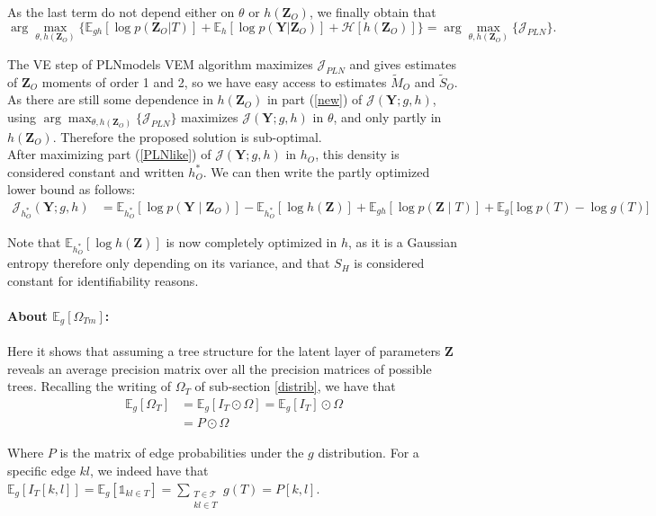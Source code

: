 \documentclass[11pt,a4paper]{article}
\newcommand{\argmax}{\arg\!\max}
\newcommand{\entr}{\mathcal{H}}
\newcommand{\Ybf}{\boldsymbol{Y}}
\newcommand{\Zbf}{\boldsymbol{Z}}
\newcommand{\Esp}{\mathds{E}}
\begin{document}
As the last term do not depend either on $\theta$ or $h(\Zbf_O)$, we finally obtain that
 $$ \argmax_{\theta, h(\Zbf_O)} \big\{\Esp_{gh}[\log p(\Zbf_O | T)] +\Esp_h[\log p(\Ybf|\Zbf_O)]+ \entr[h(\Zbf_O)]\big\} = \argmax_{\theta, h(\Zbf_O)} \big\{ \mathcal{J}_{PLN} \big\}.$$

The VE step of PLNmodels VEM algorithm maximizes $\mathcal{J}_{PLN}$ and gives estimates of $\Zbf_O$ moments of order 1 and 2, so we have easy access to estimates $\widetilde{M}_O$ and $\widetilde{S}_O$. As there are still some dependence in $h(\Zbf_O)$ in part (\ref{new}) of $\mathcal{J}(\Ybf; g,h)$, using $\argmax_{\theta, h(\Zbf_O)} \big\{ \mathcal{J}_{PLN} \big\}$ maximizes  $\mathcal{J}(\Ybf;g,h)$ in $\theta$, and only partly in $h(\Zbf_O)$. Therefore   the proposed solution is sub-optimal. \\

After maximizing part (\ref{PLNlike}) of $\mathcal{J}(\Ybf; g,h)$ in $h_O$, this density is considered constant and written $h_O^*$.  We can then write the partly optimized  lower bound as follows:
\begin{align*}
\mathcal{J}_{h_O^*}(\Ybf; g,h)&= \Esp_{h_O^*}[\log p(\Ybf \mid \Zbf_O)] - \Esp_{h_O^*}[\log h(\Zbf)] + \Esp_{gh}[\log p(\Zbf \mid T)] + \Esp_g \big[\log p(T) - \log g(T) \big]
\end{align*}

 Note that $\Esp_{h_O^*}[\log h(\Zbf)]$ is now completely optimized in $h$, as it is a Gaussian entropy therefore only depending on its variance, and that $S_H$ is considered constant for identifiability reasons.

\paragraph{About $\Esp_g [\Omega_{Tm}]$:}
Here it shows that assuming a tree structure for the latent layer of parameters $\Zbf$ reveals an average precision matrix over all the precision matrices of possible trees.  Recalling the writing of $\Omega_T$ of sub-section \ref{distrib}, we have that
 \begin{align*}
 \Esp_g [\Omega_{T}] & = \Esp_g [I_T \odot \Omega ] = \Esp_g [I_T] \odot \Omega \\
 &= P\odot \Omega
 \end{align*}

Where $P$ is the matrix of edge probabilities under the $g$ distribution. For a specific edge $kl$, we indeed have that $\Esp_g [I_T[k,l]] = \Esp_g [\mathds{1}_{kl \in T}] =  \sum_{\substack{T\in \mathcal{T}\\ kl \in T } }g(T) = P[k,l]$.
\end{document}
